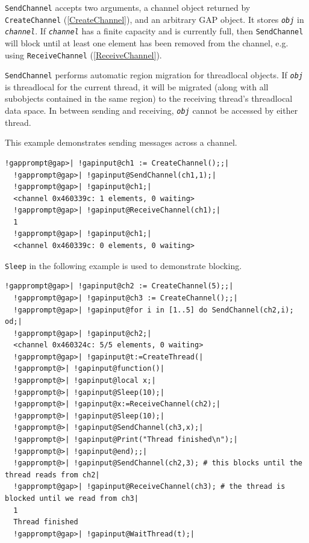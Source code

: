 \documentclass[a4paper,11pt]{report}
\begin{document}
{{{ \texttt{SendChannel} accepts two arguments, a channel object returned by \texttt{CreateChannel} (\ref{CreateChannel}), and an arbitrary GAP object. It stores \mbox{\texttt{\mdseries\slshape obj}} in \mbox{\texttt{\mdseries\slshape channel}}. If \mbox{\texttt{\mdseries\slshape channel}} has a finite capacity and is currently full, then \texttt{SendChannel} will block until at least one element has been removed from the channel, e.g.
using \texttt{ReceiveChannel} (\ref{ReceiveChannel}). 

 \texttt{SendChannel} performs automatic region migration for thread\texttt{}local
objects. If \mbox{\texttt{\mdseries\slshape obj}} is thread\texttt{}local for the current thread, it will be migrated
(along with all subobjects contained in the same region) to the receiving
thread's thread\texttt{}local data space. In between sending and
receiving, \mbox{\texttt{\mdseries\slshape obj}} cannot be accessed by either thread. 

 This example demonstrates sending messages across a channel. 
\begin{Verbatim}[commandchars=!@|,fontsize=\small,frame=single,label=Example]
  !gapprompt@gap>| !gapinput@ch1 := CreateChannel();;|
  !gapprompt@gap>| !gapinput@SendChannel(ch1,1);|
  !gapprompt@gap>| !gapinput@ch1;|
  <channel 0x460339c: 1 elements, 0 waiting>
  !gapprompt@gap>| !gapinput@ReceiveChannel(ch1);|
  1
  !gapprompt@gap>| !gapinput@ch1;|
  <channel 0x460339c: 0 elements, 0 waiting>
\end{Verbatim}
 \texttt{Sleep} in the following example is used to demonstrate blocking. 
\begin{Verbatim}[commandchars=!@|,fontsize=\small,frame=single,label=Example]
  !gapprompt@gap>| !gapinput@ch2 := CreateChannel(5);;|
  !gapprompt@gap>| !gapinput@ch3 := CreateChannel();;|
  !gapprompt@gap>| !gapinput@for i in [1..5] do SendChannel(ch2,i); od;|
  !gapprompt@gap>| !gapinput@ch2;|
  <channel 0x460324c: 5/5 elements, 0 waiting>
  !gapprompt@gap>| !gapinput@t:=CreateThread(|
  !gapprompt@>| !gapinput@function()|
  !gapprompt@>| !gapinput@local x;|
  !gapprompt@>| !gapinput@Sleep(10);|
  !gapprompt@>| !gapinput@x:=ReceiveChannel(ch2);|
  !gapprompt@>| !gapinput@Sleep(10);|
  !gapprompt@>| !gapinput@SendChannel(ch3,x);|
  !gapprompt@>| !gapinput@Print("Thread finished\n");|
  !gapprompt@>| !gapinput@end);;|
  !gapprompt@>| !gapinput@SendChannel(ch2,3); # this blocks until the thread reads from ch2|
  !gapprompt@gap>| !gapinput@ReceiveChannel(ch3); # the thread is blocked until we read from ch3|
  1
  Thread finished
  !gapprompt@gap>| !gapinput@WaitThread(t);|
\end{Verbatim}
 }

}}
\end{document}
